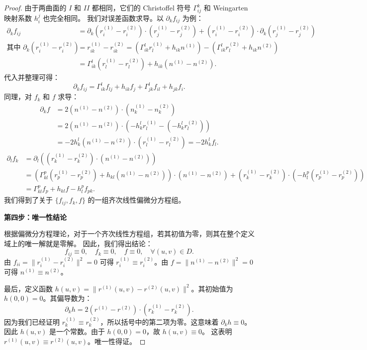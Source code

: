 \documentclass[lang=cn,10pt,thmcnt=section]{elegantbook}
\begin{document}
\begin{proof}
    由于两曲面的 $I$ 和 $II$ 都相同，它们的 Christoffel 符号 $\Gamma_{ij}^k$ 和 Weingarten 映射系数 $h_i^j$ 也完全相同。
    我们对误差函数求导。以 $\partial_k f_{ij}$ 为例：
    \begin{align*}
        \partial_k f_{ij} &= \partial_k(r_i^{(1)} - r_i^{(2)}) \cdot (r_j^{(1)} - r_j^{(2)}) + (r_i^{(1)} - r_i^{(2)}) \cdot \partial_k(r_j^{(1)} - r_j^{(2)}) \\
        \text{其中 } \partial_k(r_i^{(1)} - r_i^{(2)}) &= r_{ik}^{(1)} - r_{ik}^{(2)} = (\Gamma_{ik}^l r_l^{(1)} + h_{ik}n^{(1)}) - (\Gamma_{ik}^l r_l^{(2)} + h_{ik}n^{(2)}) \\
        &= \Gamma_{ik}^l(r_l^{(1)} - r_l^{(2)}) + h_{ik}(n^{(1)} - n^{(2)}).
    \end{align*}
    代入并整理可得：
    \[
    \partial_k f_{ij} = \Gamma_{ik}^l f_{lj} + h_{ik} f_j + \Gamma_{jk}^l f_{il} + h_{jk} f_i.
    \]
    同理，对 $f_k$ 和 $f$ 求导：
    \begin{align*}
        \partial_k f &= 2(n^{(1)} - n^{(2)}) \cdot (n_k^{(1)} - n_k^{(2)}) \\
        &= 2(n^{(1)} - n^{(2)}) \cdot (-h_k^l r_l^{(1)} - (-h_k^l r_l^{(2)})) \\
        &= -2h_k^l (n^{(1)} - n^{(2)}) \cdot (r_l^{(1)} - r_l^{(2)}) = -2h_k^l f_l.
    \end{align*}
    \begin{align*}
        \partial_l f_k &= \partial_l\left( (r_k^{(1)} - r_k^{(2)}) \cdot (n^{(1)} - n^{(2)}) \right) \\
        &= \left( \Gamma_{kl}^p(r_p^{(1)}-r_p^{(2)}) + h_{kl}(n^{(1)}-n^{(2)}) \right) \cdot (n^{(1)}-n^{(2)}) + (r_k^{(1)}-r_k^{(2)}) \cdot \left( -h_l^p(r_p^{(1)}-r_p^{(2)}) \right) \\
        &= \Gamma_{kl}^p f_p + h_{kl} f - h_l^p f_{pk}.
    \end{align*}
    我们得到了关于 $\{f_{ij}, f_k, f\}$ 的一组齐次线性偏微分方程组。

    \textbf{第四步：唯一性结论}
    
    根据偏微分方程理论，对于一个齐次线性方程组，若其初值为零，则其在整个定义域上的唯一解就是零解。
    因此，我们得出结论：
    \[
    f_{ij} \equiv 0, \quad f_k \equiv 0, \quad f \equiv 0, \quad \forall (u,v) \in D.
    \]
    由 $f_{ii} = \|r_i^{(1)} - r_i^{(2)}\|^2 = 0$ 可得 $r_i^{(1)} \equiv r_i^{(2)}$。由 $f = \|n^{(1)} - n^{(2)}\|^2 = 0$ 可得 $n^{(1)} \equiv n^{(2)}$。
    
    最后，定义函数 $h(u,v) = \|r^{(1)}(u,v) - r^{(2)}(u,v)\|^2$。其初始值为 $h(0,0)=0$。其偏导数为：
    \[
    \partial_k h = 2(r^{(1)} - r^{(2)}) \cdot (r_k^{(1)} - r_k^{(2)}).
    \]
    因为我们已经证明 $r_k^{(1)} \equiv r_k^{(2)}$，所以括号中的第二项为零。这意味着 $\partial_k h \equiv 0$。
    因此 $h(u,v)$ 是一个常数。由于 $h(0,0)=0$，故 $h(u,v) \equiv 0$。
    这表明 $r^{(1)}(u,v) \equiv r^{(2)}(u,v)$。唯一性得证。
\end{proof}
\end{document}
